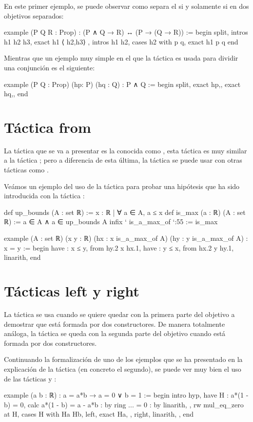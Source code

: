 En este primer ejemplo, se puede observar como separa el si y solamente si en
dos objetivos separados:

\begin{leancode}
example (P Q R : Prop) : (P ∧ Q → R) ↔ (P → (Q → R)) :=
begin
  split, 
  {intros h1 h2 h3,
  exact h1 ⟨ h2,h3⟩ },
  {intros h1 h2,
  cases h2 with p q,
  exact h1 p q}
end
\end{leancode}

Mientras que un ejemplo muy simple en el que la táctica 
es usada para dividir una conjunción es el siguiente:
\begin{leancode}
example (P Q : Prop) (hp: P) (hq : Q) : P ∧ Q :=
begin
  split, 
  {exact hp,},
  {exact hq,},
end
\end{leancode}

\section{Táctica from}
La táctica que se va a presentar es la conocida como , esta
táctica es muy similar a la táctica ; pero a diferencia
de esta última, la táctica  se puede usar con otras tácticas
como .

Veámos un ejemplo del uso de la táctica  para probar una
hipótesis que ha sido introducida con la táctica :

\begin{leancode}
def up_bounds (A : set ℝ) := { x : ℝ | ∀ a ∈ A, a ≤ x}
def is_max (a : ℝ) (A : set ℝ) := a ∈ A ∧ a ∈ up_bounds A
infix ` is_a_max_of `:55 := is_max

example (A : set ℝ) (x y : ℝ) (hx : x is_a_max_of A) (hy : y is_a_max_of A) : 
x = y :=
begin
  have : x ≤ y, from hy.2 x hx.1,
  have : y ≤ x, from hx.2 y hy.1,
  linarith,
end
\end{leancode}

\section{Tácticas left y right}
La táctica  se usa cuando se quiere quedar con la
primera parte del objetivo a demostrar que está formada por dos constructores.
De manera totalmente análoga, la táctica  se queda
con la segunda parte del objetivo cuando está formada por dos constructores.

Continuando la formalización de uno de los ejemplos que se ha presentado en la
explicación de la táctica  (en concreto el segundo), se
puede ver muy bien el uso de las tácticas  y
:
\begin{leancode}
example (a b : ℝ) : a = a*b → a = 0 ∨ b = 1 :=
begin
  intro hyp,
  have H : a*(1 - b) = 0,
  { calc a*(1 - b) = a - a*b : by ring
               ... = 0       : by linarith, },
  rw mul_eq_zero at H,
  cases H with Ha Hb,
  { left,
    exact Ha, },
  { right,
    linarith, },
end
\end{leancode}


